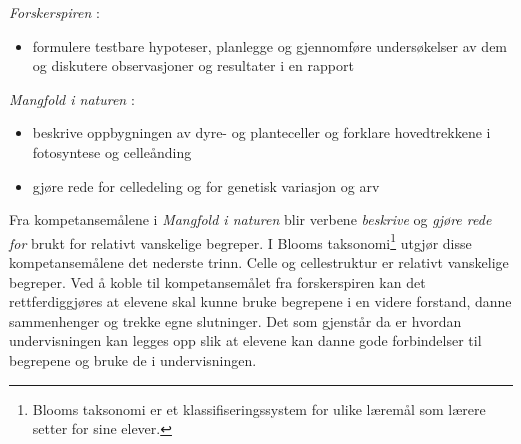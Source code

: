 \documentclass[main.tex]{subfiles}
\begin{document}
\begin{displayquote}
\emph{Forskerspiren} :
\begin{itemize}
\vspace{-2mm}
\item formulere testbare hypoteser, planlegge og gjennomføre undersøkelser 
av dem og diskutere observasjoner og resultater i en rapport
\end{itemize}
\emph{Mangfold i naturen} :
\begin{itemize}
\vspace{-2mm}
\item beskrive oppbygningen av dyre- og planteceller og forklare hovedtrekkene i fotosyntese 
og celleånding
\vspace{-2mm}
\item gjøre rede for celledeling og for genetisk variasjon og arv
\end{itemize}
\end{displayquote} 
Fra kompetansemålene i \emph{Mangfold i naturen} blir verbene \emph{beskrive} og \emph{gjøre rede 
for} brukt for relativt vanskelige begreper. I Blooms taksonomi\footnote{Blooms taksonomi er et 
klassifiseringssystem for ulike læremål som lærere setter for sine elever.} utgjør disse 
kompetansemålene det nederste trinn. Celle og cellestruktur er relativt vanskelige begreper. Ved å 
koble til kompetansemålet fra forskerspiren kan det rettferdiggjøres at elevene skal kunne bruke 
begrepene i en videre forstand, danne sammenhenger og trekke egne slutninger.
Det som gjenstår da er hvordan undervisningen kan legges opp slik at 
elevene kan danne gode forbindelser til begrepene og bruke de i undervisningen.
\end{document}

